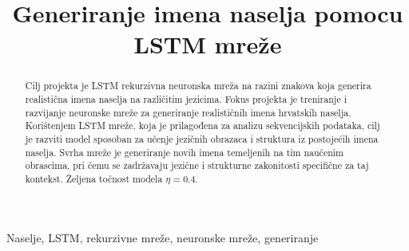 \documentclass[conference]{IEEEtran}
\begin{document}
\title{Generiranje imena naselja pomocu LSTM mreže}


\author{
\and
{}
\and
{}
\and
{}
\and
{}
\and
{}
}

\maketitle

\begin{abstract}
Cilj projekta je LSTM rekurzivna neuronska mreža na razini znakova koja generira realistična imena naselja na različitim jezicima. Fokus projekta je treniranje i razvijanje neuronske mreže za generiranje realističnih imena hrvatskih naselja. Korištenjem LSTM mreže, koja je prilagođena za analizu sekvencijskih podataka, cilj je razviti model sposoban za učenje jezičnih obrazaca i struktura iz postojećih imena naselja. Svrha mreže je generiranje novih imena temeljenih na tim naučenim obrascima, pri čemu se zadržavaju jezične i strukturne zakonitosti specifične za taj kontekst.
Željena točnost modela $\eta = 0.4$.
\end{abstract}

\begin{IEEEkeywords}
Naselje, LSTM, rekurzivne mreže, neuronske mreže, generiranje
\end{IEEEkeywords}
\end{document}
